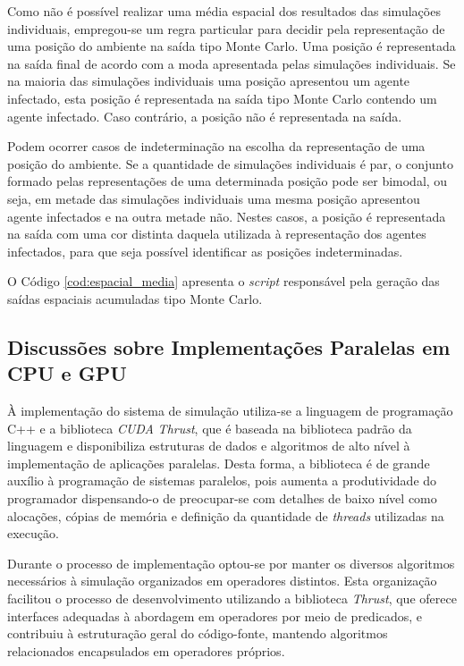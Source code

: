 Como não é possível realizar uma média espacial dos resultados das simulações individuais, empregou-se um regra particular para decidir pela representação de uma posição do ambiente na saída tipo Monte Carlo. Uma posição é representada na saída final de acordo com a moda apresentada pelas simulações individuais. Se na maioria das simulações individuais uma posição apresentou um agente infectado, esta posição é representada na saída tipo Monte Carlo contendo um agente infectado. Caso contrário, a posição não é representada na saída. 

Podem ocorrer casos de indeterminação na escolha da representação de uma posição do ambiente. Se a quantidade de simulações individuais é par, o conjunto formado pelas representações de uma determinada posição pode ser bimodal, ou seja, em metade das simulações individuais uma mesma posição apresentou agente infectados e na outra metade não. Nestes casos, a posição é representada na saída com uma cor distinta daquela utilizada à representação dos agentes infectados, para que seja possível identificar as posições indeterminadas. 

O Código \ref{cod:espacial_media} apresenta o \textit{script} responsável pela geração das saídas espaciais acumuladas tipo Monte Carlo. 
 


\subsection{Discussões sobre Implementações Paralelas em CPU e GPU} 

À implementação do sistema de simulação utiliza-se a linguagem de programação C++ e a biblioteca \textit{CUDA} \textit{Thrust}, que é baseada na biblioteca padrão da linguagem e disponibiliza estruturas de dados e algoritmos de alto nível à implementação de aplicações paralelas. Desta forma, a biblioteca é de grande auxílio à programação de sistemas paralelos, pois aumenta a produtividade do programador dispensando-o de preocupar-se com detalhes de baixo nível como alocações, cópias de memória e definição da quantidade de \textit{threads} utilizadas na execução. 

Durante o processo de implementação optou-se por manter os diversos algoritmos necessários à simulação organizados em operadores distintos. Esta organização facilitou o processo de desenvolvimento utilizando a biblioteca \textit{Thrust}, que oferece interfaces adequadas à abordagem em operadores por meio de predicados, e contribuiu à estruturação geral do código-fonte, mantendo algoritmos relacionados encapsulados em operadores próprios. 

